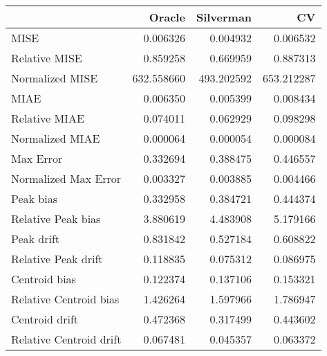 \begin{tabular}{lrrr}
  \hline
 & Oracle & Silverman & CV \\ 
  \hline
MISE & 0.006326 & 0.004932 & 0.006532 \\ 
  Relative MISE & 0.859258 & 0.669959 & 0.887313 \\ 
  Normalized MISE & 632.558660 & 493.202592 & 653.212287 \\ 
  MIAE & 0.006350 & 0.005399 & 0.008434 \\ 
  Relative MIAE & 0.074011 & 0.062929 & 0.098298 \\ 
  Normalized MIAE & 0.000064 & 0.000054 & 0.000084 \\ 
  Max Error & 0.332694 & 0.388475 & 0.446557 \\ 
  Normalized Max Error & 0.003327 & 0.003885 & 0.004466 \\ 
  Peak bias & 0.332958 & 0.384721 & 0.444374 \\ 
  Relative Peak bias & 3.880619 & 4.483908 & 5.179166 \\ 
  Peak drift & 0.831842 & 0.527184 & 0.608822 \\ 
  Relative Peak drift & 0.118835 & 0.075312 & 0.086975 \\ 
  Centroid bias & 0.122374 & 0.137106 & 0.153321 \\ 
  Relative Centroid bias & 1.426264 & 1.597966 & 1.786947 \\ 
  Centroid drift & 0.472368 & 0.317499 & 0.443602 \\ 
  Relative Centroid drift & 0.067481 & 0.045357 & 0.063372 \\ 
   \hline
\end{tabular}
